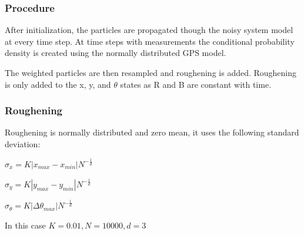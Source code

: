 \documentclass[twoside,twocolumn]{article}
\begin{document}
\subsubsection{Procedure}

After initialization, the particles are propagated though the noisy system model at every time step. At time steps with measurements the conditional probability density is created using the normally distributed GPS model.

The weighted particles are then resampled and roughening is added. Roughening is only added to the x, y, and $\theta$ states as R and B are constant with time.

\subsubsection{Roughening}

Roughening is normally distributed and zero mean, it uses the following standard deviation:

\begin{center}
$\sigma_x = K |x_{max} - x_{min}| N^{-\frac{1}{d}}$

$\sigma_y = K |y_{max} - y_{min}| N^{-\frac{1}{d}}$

$\sigma_\theta = K |\Delta\theta_{max}| N^{-\frac{1}{d}}$
\end{center}

In this case $K = 0.01, N = 10000, d = 3$
\end{document}
